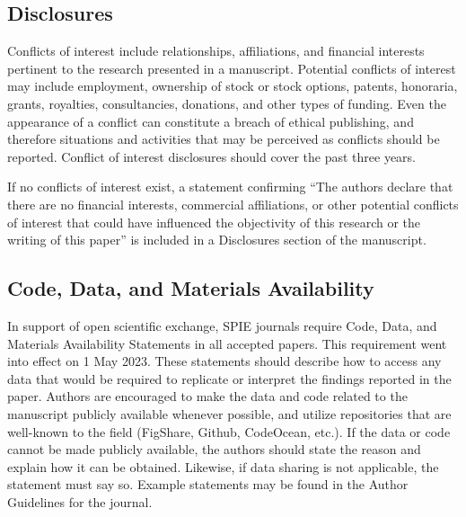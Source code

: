\documentclass[12pt]{spieman}  %
\begin{document}
\begin{spacing}{2}
\vspace{2ex}

\subsection*{Disclosures}
Conflicts of interest include relationships, affiliations, and financial interests pertinent to the research presented in a manuscript. Potential conflicts of interest may include employment, ownership of stock or stock options, patents, honoraria, grants, royalties, consultancies, donations, and other types of funding. Even the appearance of a conflict can constitute a breach of ethical publishing, and therefore situations and activities that may be perceived as conflicts should be reported. Conflict of interest disclosures should cover the past three years. 

If no conflicts of interest exist, a statement confirming “The authors declare that there are no financial interests, commercial affiliations, or other potential conflicts of interest that could have influenced the objectivity of this research or the writing of this paper” is included in a Disclosures section of the manuscript.



\subsection* {Code, Data, and Materials Availability} 
In support of open scientific exchange, SPIE journals require Code, Data, and Materials Availability Statements in all accepted papers. This requirement went into effect on 1 May 2023. These statements should describe how to access any data that would be required to replicate or interpret the findings reported in the paper. Authors are encouraged to make the data and code related to the manuscript publicly available whenever possible, and utilize repositories that are well-known to the field (FigShare, Github, CodeOcean, etc.). If the data or code cannot be made publicly available, the authors should state the reason and explain how it can be obtained. Likewise, if data sharing is not applicable, the statement must say so. Example statements may be found in the Author Guidelines for the journal.



\end{spacing}
\end{document}
